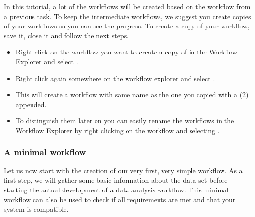 In this tutorial, a lot of the workflows will be created based on the workflow from a previous task.
To keep the intermediate workflows, we suggest you create copies of your workflows so you can see the progress.
To create a copy of your workflow, save it, close it and follow the next steps.

\begin{itemize}
\item
Right click on the workflow you want to create a copy of in the Workflow Explorer and select .
\item
Right click again somewhere on the workflow explorer and select .
\item
This will create a workflow with same name as the one you copied with a (2) appended.
\item
To distinguish them later on you can easily rename the workflows in the Workflow Explorer by right clicking on the workflow and selecting . 
\end{itemize}

\subsubsection{A minimal workflow}
\label{Minimal_Workflow}

Let us now start with the creation of our very first, very simple workflow.
As a first step, we will gather some basic information about the data set before starting the
actual development of a data analysis workflow. This minimal workflow can also be used to check if all requirements 
are met and that your system is compatible.

